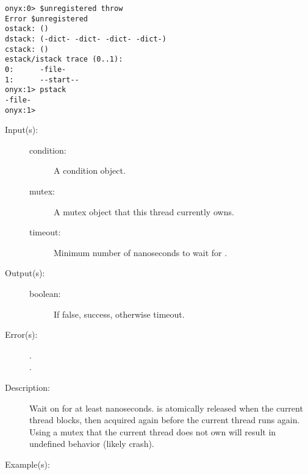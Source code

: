 \begin{description}
\begin{description}
\begin{verbatim}
onyx:0> $unregistered throw
Error $unregistered
ostack: ()
dstack: (-dict- -dict- -dict- -dict-)
cstack: ()
estack/istack trace (0..1):
0:      -file-
1:      --start--
onyx:1> pstack
-file-
onyx:1>
		\end{verbatim}
	\end{description}
\label{systemdict:timedwait}
\item[{\onyxop{condition mutex timeout}{timedwait}{boolean}}: ]
	\begin{description}\item[]
	\item[Input(s): ]
		\begin{description}\item[]
		\item[condition: ]
			A condition object.
		\item[mutex: ]
			A mutex object that this thread currently owns.
		\item[timeout: ]
			Minimum number of nanoseconds to wait for
			.
		\end{description}
	\item[Output(s): ]
		\begin{description}\item[]
		\item[boolean: ]
			If false, success, otherwise timeout.
		\end{description}
	\item[Error(s): ]
		\begin{description}\item[]
		\item[.]
		\item[.]
		\end{description}
	\item[Description: ]
		Wait on  for at least 
		nanoseconds.   is atomically released when the
		current thread blocks, then acquired again before the current
		thread runs again.  Using a mutex that the current thread does
		not own will result in undefined behavior (likely crash).
	\item[Example(s): ]\begin{verbatim}


\end{verbatim}
\end{description}
\end{description}
